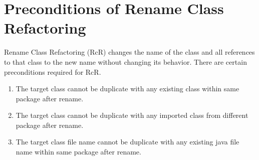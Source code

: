 \documentclass[10pt,conference]{IEEEtran}
\begin{document}
\section{\textbf{Preconditions of Rename Class Refactoring}}
Rename Class Refactoring (RcR) changes the name of the class and all references to that class to the new name without changing its behavior. There are certain preconditions required for RcR. 
\begin{enumerate}
	\item The target class cannot be duplicate with any existing class within same package after rename.
	\item The target class cannot be duplicate with any imported class from different package after rename.
	\item The target class file name cannot be duplicate with any existing java file name within same package after rename.
\end{enumerate}

\label{sec:precon1}
	
\label{sec:precon2}

\label{sec:precon3}



 









\end{document}

